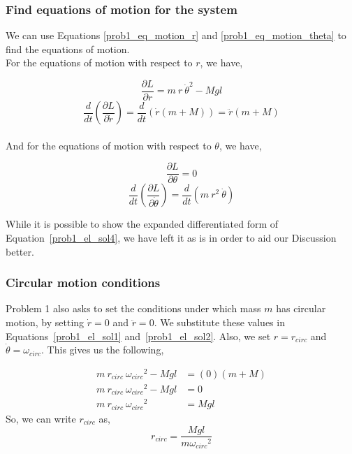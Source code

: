 \documentclass[conference]{IEEEtran}
\begin{document}
\subsubsection{Find equations of motion for the system}
We can use Equations \ref{prob1_eq_motion_r} and \ref{prob1_eq_motion_theta}
to find the equations of motion.\\

For the equations of motion with respect to $r$, we have,

\begin{equation}\label{prob1_el_sol1}
    \frac{\partial L}{\partial r} = m~r~\dot{\theta}^2 - Mgl
\end{equation}
\begin{equation}\label{prob1_el_sol2}
    \frac{d}{dt}\left(\frac{\partial L}{\partial \dot{r}}\right) 
    = \frac{d}{dt}\left( \dot{r}(m + M) \right) = \ddot{r}(m + M)
\end{equation}\\

And for the equations of motion with respect to $\theta$, we have,

\begin{equation}\label{prob1_el_sol3}
    \frac{\partial L}{\partial \theta} = 0
\end{equation}
\begin{equation}\label{prob1_el_sol4}
    \frac{d}{dt}\left(\frac{\partial L}{\partial \dot{\theta}}\right) 
    = \frac{d}{dt}\left( m~r^2~\dot{\theta} \right)
\end{equation}

While it is possible to show the expanded differentiated form of 
Equation~\ref{prob1_el_sol4}, we have left it as is in order
to aid our Discussion better.

\subsubsection{Circular motion conditions}

Problem 1 also asks to set the conditions under which mass $m$
has circular motion, by setting
$\dot{r} = 0$ and $\ddot{r} = 0$. We substitute these values in Equations~\ref{prob1_el_sol1}
and~\ref{prob1_el_sol2}. Also, we set $r = r_{circ}$ and $\dot{\theta} = \omega_{circ}$.
This gives us the following,

\begin{align*}
    m~r_{circ}~{\omega_{circ}}^2 - Mgl &= (0) (m + M)\\
    m~r_{circ}~{\omega_{circ}}^2 - Mgl &= 0\\
    m~r_{circ}~{\omega_{circ}}^2 &= Mgl
\end{align*}
So, we can write $r_{circ}$ as,
\begin{equation}\label{r_circ_val}
    r_{circ} = \frac{Mgl}{m{\omega_{circ}}^2}
\end{equation}
\end{document}

